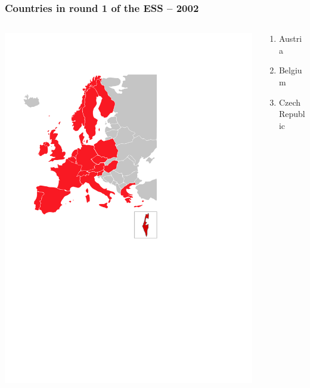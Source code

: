 \documentclass{beamer}
\begin{document}
\begin{frame}

\frametitle{Countries in round 1 of the ESS -- 2002}

	\begin{columns}[T]	
		\begin{column}{5.5cm}
			\includegraphics[width=\textwidth]{i/round1.pdf}
		\end{column}
		\begin{column}{4.5cm}
			\begin{columns}	
				\begin{column}{2.2cm}
					\begin{scriptsize}\begin{enumerate}
						\item Austria
						\item Belgium	
						\item Czech Republic 

\end{enumerate}
\end{scriptsize}
\end{column}
\end{columns}
\end{column}
\end{columns}
\end{frame}
\end{document}
